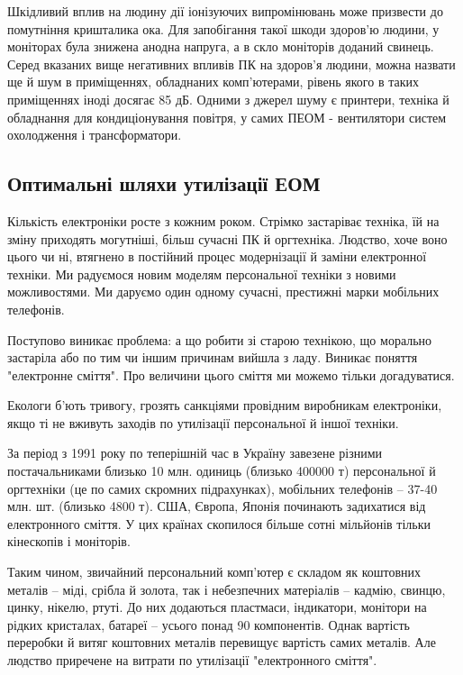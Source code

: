 Шкідливий вплив на людину дії іонізуючих випромінювань може призвести до помутніння кришталика ока. Для запобігання 
такої шкоди здоров’ю людини, у моніторах була знижена анодна напруга, а в скло моніторів доданий свинець.
Серед вказаних вище негативних впливів ПК на здоров’я людини, можна назвати ще й шум в приміщеннях, обладнаних комп'ютерами, 
рівень якого в таких приміщеннях іноді досягає 85 дБ. Одними з джерел шуму є принтери, техніка й обладнання для кондиціонування 
повітря, у самих ПЕОМ - вентилятори систем охолодження і трансформатори. 

\subsection{Оптимальні шляхи утилізації ЕОМ}
Кількість електроніки росте з кожним роком.  Стрімко застаріває техніка, їй на зміну приходять могутніші, більш сучасні ПК й оргтехніка. Людство, хоче воно цього чи ні, втягнено в постійний процес модернізації й заміни електронної техніки. Ми радуємося новим моделям персональної техніки з новими можливостями. Ми даруємо один одному сучасні, престижні марки мобільних телефонів.

Поступово виникає проблема: а що робити зі старою технікою, що морально застаріла або по тим чи іншим причинам вийшла з ладу. 
Виникає поняття "електронне сміття".  Про величини цього сміття ми можемо тільки догадуватися. 

Екологи б’ють тривогу, грозять санкціями провідним виробникам електроніки,  якщо ті не вживуть заходів по 
утилізації персональної й іншої техніки.

За період з 1991 року по теперішній час в Україну завезене різними постачальниками близько 10 млн. одиниць 
(близько 400000 т) персональної й оргтехніки (це по самих скромних підрахунках), мобільних телефонів – 37-40 
млн. шт. (близько 4800 т). США, Європа, Японія починають задихатися від електронного сміття. У цих країнах 
скопилося більше сотні мільйонів тільки кінескопів і моніторів.                                                                                                                      

Таким чином, звичайний персональний комп’ютер є складом як коштовних  металів – міді, срібла й золота, так і 
небезпечних матеріалів –  кадмію, свинцю, цинку, нікелю, ртуті. До них додаються пластмаси, індикатори, монітори 
на рідких кристалах, батареї – усього понад 90 компонентів. Однак вартість переробки  й витяг коштовних металів 
перевищує вартість самих металів. Але людство приречене на витрати по утилізації "електронного сміття".   

